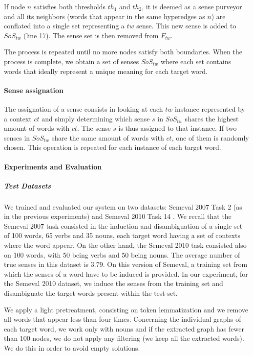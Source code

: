 If node $n$ satisfies both thresholds $th_1$ and $th_2$, it is deemed as a sense purveyor and all its neighbors (words that appear in the same hyperedges as $n$) are conflated into a single set representing a $tw$ sense. This new sense is added to $SoS_{tw}$ (line 17). The sense set is then removed from $F_{tw}$.

The process is repeated until no more nodes satisfy both boundaries. When the process is complete, we obtain a set of senses $SoS_{tw}$ where each set contains words that ideally represent a unique meaning for each target word. 

\paragraph{Sense assignation}

The assignation of a sense consists in looking at each $tw$ instance represented by a context $ct$ and simply determining which sense $s$ in $SoS_{tw}$ shares the highest amount of words with $ct$. The sense $s$ is thus assigned to that instance. If two senses in $SoS_{tw}$ share the same amount of words with $ct$, one of them is randomly chosen.  This operation is repeated for each instance of each target word. 



	
\paragraph{Experiments and Evaluation}
\subparagraph{Test Datasets}
We trained and evaluated our system on two datasets: Semeval 2007 Task 2 (as in the previous experiments) and Semeval 2010 Task 14 \cite{Semeval2010}. We recall that the Semeval 2007 task consisted in the induction and disambiguation of a single set of 100 words, 65 verbs and 35 nouns, each target word having a set of contexts where the word appear. On the other hand, the Semeval 2010 task consisted also on 100 words, with 50 being verbs and 50 being nouns. The average number of true senses in this dataset is 3.79. On this version of Semeval, a training set from which the senses of a word have to be induced is provided. In our experiment, for the Semeval 2010 dataset, we induce the senses from the training set and disambiguate the target words present within the test set.

We apply a light pretreatment, consisting on token lemmatization and we remove all words that appear less than four times. Concerning the individual graphs of each target word, we work only with nouns and if the extracted graph has fewer than 100 nodes, we do not apply any filtering (we keep all the extracted words). We do this in order to avoid empty solutions.



